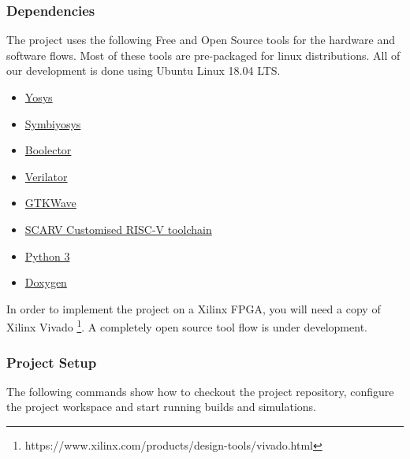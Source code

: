 
\subsubsection{Dependencies}

The project uses the following Free and Open Source tools for
the hardware and software flows.
Most of these tools are pre-packaged for linux distributions.
All of our development is done using Ubuntu Linux 18.04 LTS.

\begin{itemize}[noitemsep]
\item \href{http://www.clifford.at/yosys/}{Yosys}
\item \href{https://symbiyosys.readthedocs.io/en/latest/}{Symbiyosys}
\item \href{https://boolector.github.io/}{Boolector}
\item \href{https://www.veripool.org/wiki/verilator}{Verilator}
\item \href{http://gtkwave.sourceforge.net/}{GTKWave}
\item \href{https://github.com/scarv/riscv-tools.git}{SCARV Customised RISC-V toolchain}
\item \href{https://www.python.org/downloads/}{Python 3}
\item \href{http://www.doxygen.nl}{Doxygen}
\end{itemize}

In order to implement the project on a Xilinx FPGA, you will
need a copy of Xilinx Vivado
\footnote{https://www.xilinx.com/products/design-tools/vivado.html}.
A completely open source tool flow is under development.

\subsubsection{Project Setup}

The following commands show how to checkout the \SCARVSOC project
repository, configure the project workspace and start running
builds and simulations.

